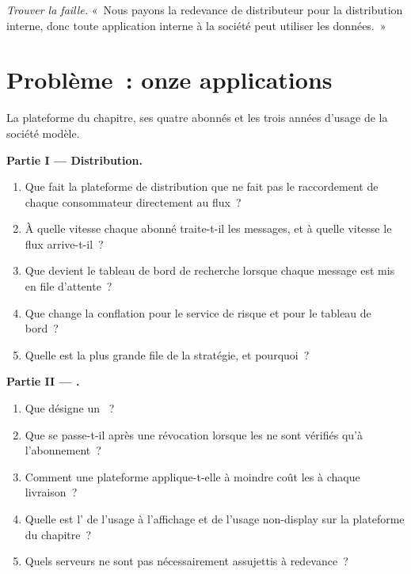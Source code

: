 \begin{exercise}[$\star\star\star$]\label{exo:pl:market-data-distribution-and-entitlements:8}
\emph{Trouver la faille.} «~Nous payons la redevance de distributeur pour la distribution interne, donc toute application interne à la société peut utiliser les
données.~»
\end{exercise}

\section{Problème~: onze applications}

\begin{problem}\label{pb:pl:market-data-distribution-and-entitlements:1}
La plateforme du chapitre, ses quatre abonnés et les trois années d'usage de la société modèle.

\medskip\noindent\textbf{Partie I --- Distribution.}
\begin{enumerate}
\item Que fait la plateforme de distribution que ne fait pas le raccordement de chaque consommateur directement au flux~?
\item À quelle vitesse chaque abonné traite-t-il les messages, et à quelle vitesse le flux arrive-t-il~?
\item Que devient le tableau de bord de recherche lorsque chaque message est mis en file d'attente~?
\item Que change la conflation pour le service de risque et pour le tableau de bord~?
\item Quelle est la plus grande file de la stratégie, et pourquoi~?
\end{enumerate}

\medskip\noindent\textbf{Partie II --- .}
\begin{enumerate}[resume]
\item Que désigne un ~?
\item Que se passe-t-il après une révocation lorsque les  ne sont vérifiés qu'à l'abonnement~?
\item Comment une plateforme applique-t-elle à moindre coût les  à chaque livraison~?
\item Quelle est l' de l'usage à l'affichage et de l'usage non-display sur la plateforme du chapitre~?
\item Quels serveurs ne sont pas nécessairement assujettis à redevance~?
\end{enumerate}


\end{problem}
